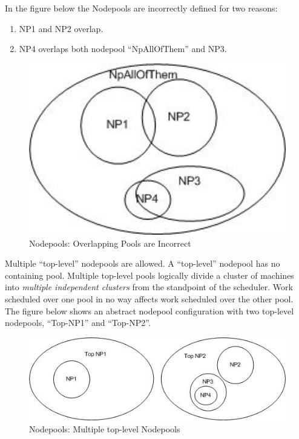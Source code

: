     In the figure below the Nodepools are incorrectly defined for two reasons:
    \begin{enumerate}
       \item NP1 and NP2 overlap.
       \item NP4 overlaps both nodepool ``NpAllOfThem'' and NP3.
    \end{enumerate}
    
    \begin{figure}[H]
      \centering
      \includegraphics[width=5.5in]{images/Nodepool2.jpg}
      \caption{Nodepools: Overlapping Pools are Incorrect}
      \label{fig:Nodepools2}
    \end{figure}

    Multiple ``top-level'' nodepools are allowed.  A ``top-level'' nodepool has no containing
    pool.  Multiple top-level pools logically divide a cluster of machines into {\em multiple
      independent clusters} from the standpoint of the scheduler.  Work scheduled over one
    pool in no way affects work scheduled over the other pool.  The figure below shows an
    abstract nodepool configuration with two top-level nodepools, ``Top-NP1'' and ``Top-NP2''.
    \begin{figure}[H]
      \centering
      \includegraphics[width=5.5in]{images/Nodepool3.jpg}
      \caption{Nodepools: Multiple top-level Nodepools}
      \label{fig:Nodepools3}
    \end{figure}

